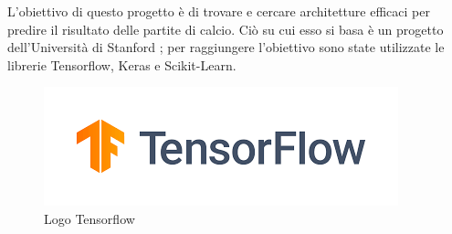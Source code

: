 L'obiettivo di questo progetto è di trovare e cercare architetture efficaci per predire il risultato delle partite di calcio. Ciò su cui esso si basa è un progetto dell'Università di Stanford \cite{cs230:2020}; per raggiungere l'obiettivo sono state utilizzate le librerie Tensorflow, Keras e Scikit-Learn.

\begin{figure}[h]
    \centering
    \includegraphics[scale=0.7]{tesina/img/tensorflow_logo.png}
    \caption{Logo Tensorflow}
    \label{fig:my_label}
\end{figure}